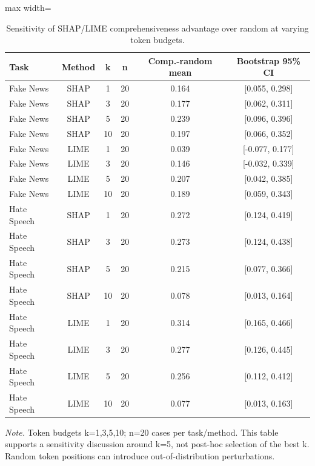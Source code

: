\begin{table}[t]
\centering
\caption{Sensitivity of SHAP/LIME comprehensiveness advantage over random at varying token budgets.}
\label{tab:ksweep}
\footnotesize
\begin{adjustbox}{max width=\linewidth}
\begin{tabular}{lccccc}
\toprule
Task & Method & k & n & Comp.-random mean & Bootstrap 95\% CI \\
\midrule
Fake News & SHAP & 1 & 20 & 0.164 & [0.055, 0.298] \\
Fake News & SHAP & 3 & 20 & 0.177 & [0.062, 0.311] \\
Fake News & SHAP & 5 & 20 & 0.239 & [0.096, 0.396] \\
Fake News & SHAP & 10 & 20 & 0.197 & [0.066, 0.352] \\
Fake News & LIME & 1 & 20 & 0.039 & [-0.077, 0.177] \\
Fake News & LIME & 3 & 20 & 0.146 & [-0.032, 0.339] \\
Fake News & LIME & 5 & 20 & 0.207 & [0.042, 0.385] \\
Fake News & LIME & 10 & 20 & 0.189 & [0.059, 0.343] \\
Hate Speech & SHAP & 1 & 20 & 0.272 & [0.124, 0.419] \\
Hate Speech & SHAP & 3 & 20 & 0.273 & [0.124, 0.438] \\
Hate Speech & SHAP & 5 & 20 & 0.215 & [0.077, 0.366] \\
Hate Speech & SHAP & 10 & 20 & 0.078 & [0.013, 0.164] \\
Hate Speech & LIME & 1 & 20 & 0.314 & [0.165, 0.466] \\
Hate Speech & LIME & 3 & 20 & 0.277 & [0.126, 0.445] \\
Hate Speech & LIME & 5 & 20 & 0.256 & [0.112, 0.412] \\
Hate Speech & LIME & 10 & 20 & 0.077 & [0.013, 0.163] \\
\bottomrule
\end{tabular}
\end{adjustbox}
\par\vspace{2pt}
\begin{minipage}{\linewidth}
\scriptsize\emph{Note.} Token budgets k=1,3,5,10; n=20 cases per task/method. This table supports a sensitivity discussion around k=5, not post-hoc selection of the best k. Random token positions can introduce out-of-distribution perturbations.
\end{minipage}
\end{table}

